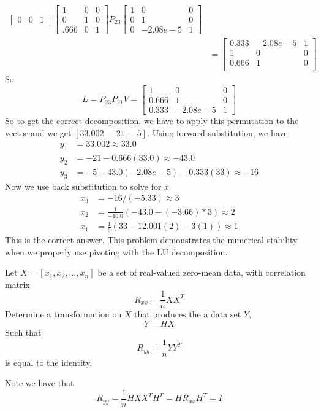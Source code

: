 \documentclass{homework}
\begin{document}
\begin{solution}
\[\begin{aligned}
\begin{bmatrix}
      0 & 0 & 1
    \end{bmatrix}
    \begin{bmatrix}
      1 & 0 & 0 \\
      0 & 1 & 0 \\
      .666 & 0 & 1
    \end{bmatrix}
    P_{23}
    \begin{bmatrix}
      1 & 0 & 0 \\
      0 & 1 & 0 \\
      0 & -2.08e-5 & 1
    \end{bmatrix} \\
    &=
    \begin{bmatrix}
      0.333 & -2.08e-5 & 1 \\
      1 & 0 & 0 \\
      0.666 & 1 & 0 \\
    \end{bmatrix}
  \end{aligned}
  \]
  So
  \[
    L = 
    P_{23}P_{21}V = 
    \begin{bmatrix}
      1 & 0 & 0 \\
      0.666 & 1 & 0 \\
      0.333 & -2.08e-5 & 1 
    \end{bmatrix}
  \]
  So to get the correct decomposition, we have to apply this permutation to the vector and we get $[33.002\ -21\ -5]$.
  Using forward substitution, we have
  \[
    \begin{aligned}
      y_1 &= 33.002 \approx 33.0 \\
      y_2 &= -21 - 0.666(33.0) \approx -43.0 \\
      y_3 &= -5 -43.0(-2.08e-5) -0.333(33) \approx -16
    \end{aligned}
  \]
  Now we use back substitution to solve for $x$
  \[
    \begin{aligned}
      x_3 &= -16/(-5.33) \approx 3 \\
      x_2 &= \frac{1}{-16.0}(-43.0 - (-3.66)*3) \approx 2 \\
      x_1 &= \frac{1}{6}(33 - 12.001(2) - 3(1)) \approx 1
    \end{aligned}
  \]
  This is the correct answer. This problem demonstrates the numerical stability when we properly use pivoting with the LU decomposition.
\end{solution}

\begin{problem}[5-8]
  Let $X = [x_1,x_2,\dots,x_n]$ be a set of real-valued zero-mean data, with correlation matrix
  \[R_{xx} = \frac{1}{n} XX^T\]
  Determine a transformation on $X$ that produces the a data set $Y$,
  \[ Y = HX\]
  Such that 
  \[R_{yy} = \frac{1}{n}YY^T\]
  is equal to the identity.
\end{problem}

\begin{solution}
  Note we have that 
\[ R_{yy} = \frac{1}{n} HXX^TH^T = HR_{xx}H^T = I\]
\end{solution}
\end{document}
